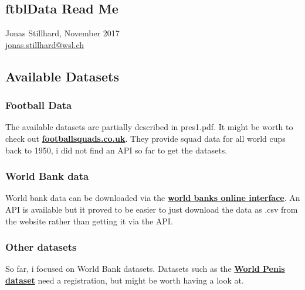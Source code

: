 \documentclass[10pt,a4paper,notitlepage,onecolumn]{article}
\begin{document}
\begin{raggedright}

\subsection*{ftblData Read Me}
Jonas Stillhard, November 2017\\
\href{mailto:jonas.stillhard@wsl.ch}{jonas.stillhard@wsl.ch}

\subsection*{Available Datasets}
\subsubsection*{Football Data}
The available datasets are partially described in pres1.pdf. It might be worth to check out   \href{http://www.footballsquads.co.uk/national.htm}{\textbf{footballsquads.co.uk}}. They provide squad data for all world cups back to 1950, i did not find an API so far to get the datasets. 

\subsubsection*{World Bank data} 
World bank data can be downloaded via the \href{https://data.worldbank.org/}{\textbf{world banks online interface}}. An API is available but it proved to be easier to just download the data as .csv from the website rather than getting it via the API. 

\subsubsection*{Other datasets}
So far, i focused on World Bank datasets. Datasets such as the \href{https://data.world/jemus42/world-penis-data}{\textbf{World Penis dataset}} need a registration, but might be worth having a look at. 


\end{raggedright}
\end{document}
